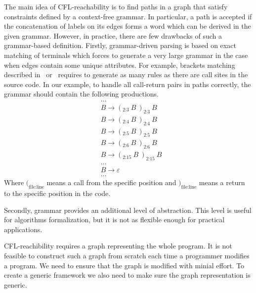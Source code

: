 The main idea of CFL-reachability is to find paths in a graph that satisfy constraints defined by a context-free grammar.
In particular, a path is accepted if the concatenation of labels on its edges forms a word which can be derived in the given grammar.
However, in practice, there are few drawbacks of such a grammar-based definition.
Firstly, grammar-driven parsing is based on exact matching of terminals which forces to generate a very large grammar in the case when edges contain some unique attributes.
For example, brackets matching described in~\cite{CFLr} or~\cite{Zheng, JavaCFL} requires to generate as many rules as there are call sites in the source code.
In our example, to handle all call-return pairs in paths correctly, the grammar should contain the following productions.
\begin{equation}
	\begin{split}
		& \ldots \\
		& B \rightarrow (_\text{2:3}\ B\  )_\text{2:3}\ B \\
		& B \rightarrow (_\text{2:4}\ B\  )_\text{2:4}\ B \\
		& B \rightarrow (_\text{2:5}\ B\  )_\text{2:5}\ B \\
		& B \rightarrow (_\text{2:6}\ B\  )_\text{2:6}\ B \\
		& B \rightarrow (_\text{2:15}\ B\ )_\text{2:15}\ B \\
		& \ldots \\
		& B \rightarrow \varepsilon \\
		& \ldots
	\end{split}
\end{equation}
Where $(_{\text{file}:\text{line}}$ means a call from the specific position and $)_{\text{file}:\text{line}}$ means a return to the specific position in the code.

Secondly, grammar provides an additional level of abstraction.
This level is useful for algorithms formalization, but it is not as flexible enough for practical applications.

CFL-reachibility requires a graph representing the whole program.
It is not feasible to construct such a graph from scratch each time a programmer modifies a program.
We need to ensure that the graph is modified with minial effort.
To create a generic framework we also need to make sure the graph representation is generic.

